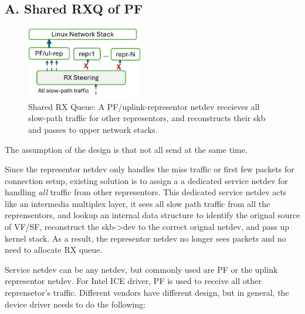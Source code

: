 \documentclass[letterpaper]{article}
\begin{document}
\subsection{A. Shared RXQ of PF}

\begin{figure}[t!]
\includegraphics[width=2in]{design1.pdf}
\centering
\caption{Shared RX Queue: A PF/uplink-representor netdev receieves all slow-path traffic
for other representors, and reconstructs their skb and passes to upper
network stacks.}
\label{fig:arch}
\end{figure}

The assumption of the design is that not all send at the same time.

Since the representor netdev only handles the miss traffic or first
few packets for connection setup, existing solution is to assign a
a dedicated service netdev for handling \emph{all} traffic from other
representors. This dedicated service netdev acts like an intermedia
multiplex layer, it sees all slow path traffic from all the
reprensentors, and lookup an internal data structure to identify the
orignal source of VF/SF, reconstruct the skb->dev to the correct
orignal netdev, and pass up kernel stack. As a result, the representor
netdev no longer sees packets and no need to allocate RX queue.

Service netdev can be any netdev, but commonly used are PF or the uplink
representor netdev. For Intel ICE driver, PF is used to receive all other
reprensetor's traffic.
Different vendors have different design, but in general, the device
driver needs to do the following:
\end{document}
